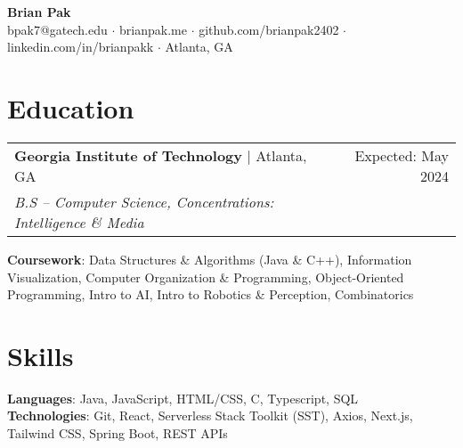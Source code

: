 \documentclass[letterpaper,11pt]{article}
\makeatletter
\newcommand{\resumeEducationHeading}[5]{
    \begin{tabular*}{0.99\textwidth}[t]{l@{\extracolsep{\fill}}r}
      \textbf{#1} $\vert$ #2 & #3 \\
      \textit{\small#4} & \textit{\small #5} \\
    \end{tabular*}\vspace{0.5pt}
}
\newcommand{\resumeExperienceHeading}[3]{
    \begin{tabular*}{0.99\textwidth}[t]{l@{\extracolsep{\fill}}r}
      \textbf{#1} $\vert$ {#2} & {#3} \\
    \end{tabular*}\vspace{-3pt}
}
\newcommand{\resumeItemListStart}{\begin{itemize}[noitemsep]\vspace{-4pt}}
\newcommand{\resumeItemListEnd}{\end{itemize}}
\makeatother
\begin{document}
\begin{center}
  \textbf{\huge Brian Pak} \\
  \vspace*{0.1cm}
  {bpak7@gatech.edu} $\cdot$ {brianpak.me} $\cdot$ {github.com/brianpak2402} $\cdot$ {linkedin.com/in/brianpakk}  $\cdot$ Atlanta, GA
\end{center}

\section{Education}
    \resumeEducationHeading
      {Georgia Institute of Technology}{Atlanta, GA}{Expected: May 2024}
      {B.S -- Computer Science, Concentrations: Intelligence \& Media}{\vspace{0.1cm}} 
    \textbf{Coursework}{: Data Structures \& Algorithms (Java \& C++), Information Visualization, Computer Organization \& Programming, Object-Oriented Programming, Intro to AI, Intro to Robotics \& Perception, Combinatorics} \\

  
\section{Skills}
    \textbf{Languages}{: Java, JavaScript, HTML/CSS, C, Typescript, SQL} \\
    \textbf{Technologies}{: Git, React, Serverless Stack Toolkit (SST), Axios, Next.js, Tailwind CSS, Spring Boot, REST APIs}
\end{document}
